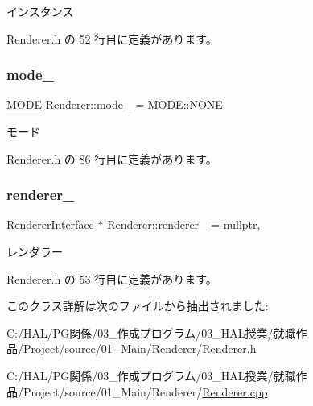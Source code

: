 インスタンス 



 Renderer.\+h の 52 行目に定義があります。

\mbox{\label{class_renderer_adaed44b3c6c8b0879b8cd52f677941cf}} 
\subsubsection{\texorpdfstring{mode\+\_\+}{mode\_}}
{\footnotesize\ttfamily \mbox{\hyperlink{class_renderer_ab5a9379ccadcf2b3394c61cf8c835fec}{M\+O\+DE}} Renderer\+::mode\+\_\+ = M\+O\+D\+E\+::\+N\+O\+NE\hspace{0.3cm}{\ttfamily [private]}}



モード 



 Renderer.\+h の 86 行目に定義があります。

\mbox{\label{class_renderer_a64d00cd885d84ff355228d884c0215dc}} 
\subsubsection{\texorpdfstring{renderer\+\_\+}{renderer\_}}
{\footnotesize\ttfamily \mbox{\hyperlink{class_renderer_interface}{Renderer\+Interface}} $\ast$ Renderer\+::renderer\+\_\+ = nullptr\hspace{0.3cm}{\ttfamily [static]}, {\ttfamily [private]}}



レンダラー 



 Renderer.\+h の 53 行目に定義があります。



このクラス詳解は次のファイルから抽出されました\+:\begin{DoxyCompactItemize}
\item 
C\+:/\+H\+A\+L/\+P\+G関係/03\+\_\+作成プログラム/03\+\_\+\+H\+A\+L授業/就職作品/\+Project/source/01\+\_\+\+Main/\+Renderer/\mbox{\hyperlink{_renderer_8h}{Renderer.\+h}}\item 
C\+:/\+H\+A\+L/\+P\+G関係/03\+\_\+作成プログラム/03\+\_\+\+H\+A\+L授業/就職作品/\+Project/source/01\+\_\+\+Main/\+Renderer/\mbox{\hyperlink{_renderer_8cpp}{Renderer.\+cpp}}\end{DoxyCompactItemize}
